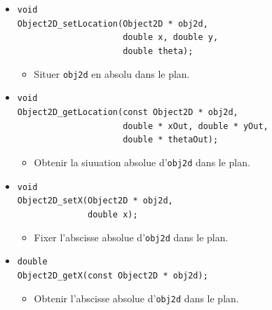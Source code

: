 \documentclass[12pt]{article}
\begin{document}
\begin{itemize}

\item \verb!void! \\
      \verb!Object2D_setLocation(Object2D * obj2d,! \\
      \verb!                     double x, double y,! \\
      \verb!                     double theta);!
      \begin{itemize}
      \item Situer \verb!obj2d! en absolu dans le plan.
      \end{itemize}

\item \verb!void! \\
      \verb!Object2D_getLocation(const Object2D * obj2d,! \\
      \verb!                     double * xOut, double * yOut,! \\
      \verb!                     double * thetaOut);!
      \begin{itemize}
      \item Obtenir la siuuation absolue d'\verb!obj2d! dans le plan.
      \end{itemize}

\item \verb!void! \\
      \verb!Object2D_setX(Object2D * obj2d,! \\
      \verb!              double x);!
      \begin{itemize}
      \item Fixer l'abscisse absolue d'\verb!obj2d! dans le plan.
      \end{itemize}

\item \verb!double! \\
      \verb!Object2D_getX(const Object2D * obj2d);!
      \begin{itemize}
      \item Obtenir l'abscisse absolue d'\verb!obj2d! dans le plan.
      \end{itemize}


\end{itemize}
\end{document}
